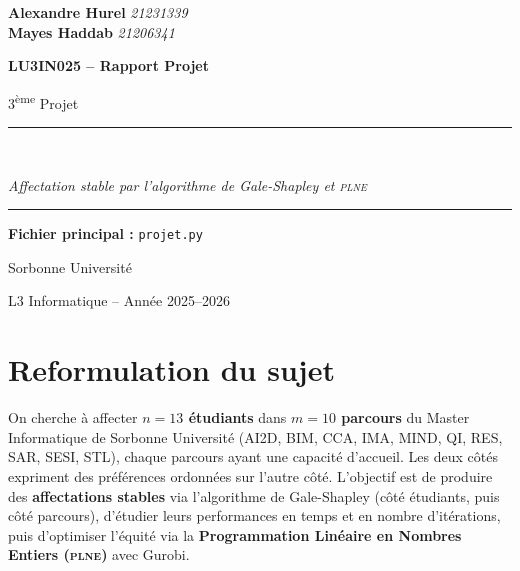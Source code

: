 \documentclass[11pt,a4paper]{article}
\newcommand{\PLNE}{\textsc{plne}}
\begin{document}
\begin{titlepage}
  \noindent
  {\large
    \textbf{Alexandre Hurel} \quad \textit{21231339}\\[0.2cm]
    \textbf{Mayes Haddab} \quad \textit{21206341}
  }

  \centering
  \vspace*{3cm}
  {\Huge\bfseries\color{darkblue} LU3IN025 -- Rapport Projet\par}
  \vspace{0.5cm}
  {\Large 3\textsuperscript{ème} Projet\par}
  \vspace{1cm}
  \rule{\linewidth}{0.5pt}\\[0.4cm]
  {\large\itshape Affectation stable par l'algorithme de Gale-Shapley et \PLNE\par}
  \rule{\linewidth}{0.5pt}
  \vspace{2cm}
  {\large \textbf{Fichier principal :} \texttt{projet.py}\par}
  \vfill
  {\large Sorbonne Université\par}
  {\normalsize L3 Informatique -- Année 2025--2026\par}
\end{titlepage}

\tableofcontents
\newpage

\section{Reformulation du sujet}

On cherche à affecter \textbf{$n = 13$ étudiants} dans \textbf{$m = 10$ parcours} du Master Informatique de Sorbonne Université (AI2D, BIM, CCA, IMA, MIND, QI, RES, SAR, SESI, STL), chaque parcours ayant une capacité d'accueil. Les deux côtés expriment des préférences ordonnées sur l'autre côté. L'objectif est de produire des \textbf{affectations stables} via l'algorithme de Gale-Shapley (côté étudiants, puis côté parcours), d'étudier leurs performances en temps et en nombre d'itérations, puis d'optimiser l'équité via la \textbf{Programmation Linéaire en Nombres Entiers (\PLNE)} avec Gurobi.

\end{document}
